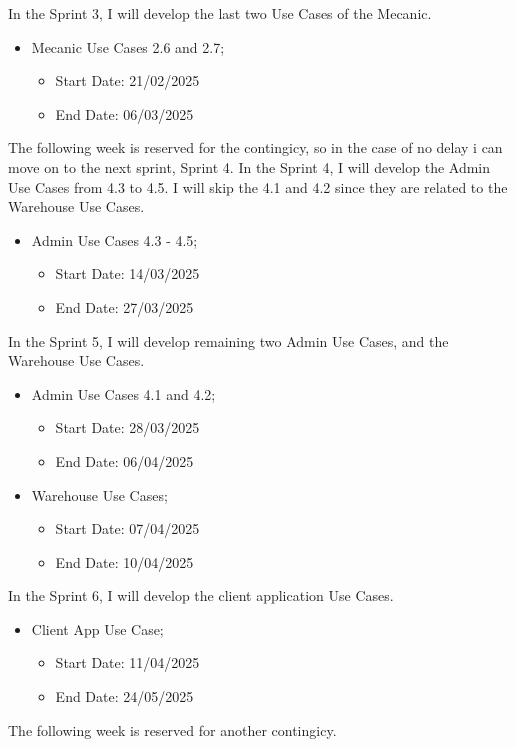In the Sprint 3, I will develop the last two Use Cases of the Mecanic.  

  \begin{itemize}
    \item Mecanic Use Cases 2.6 and 2.7;
    \begin{itemize}
      \item Start Date: 21/02/2025 
      \item End Date: 06/03/2025 
  \end{itemize}
\end{itemize}

The following week is reserved for the contingicy, so in the case of no delay i can move on to the next sprint, Sprint 4.
In the Sprint 4, I will develop the Admin Use Cases from 4.3 to 4.5. I will skip the 4.1 and 4.2 since they are related to the Warehouse Use Cases.

    \begin{itemize}
      \item Admin Use Cases 4.3 - 4.5;
    \begin{itemize}
      \item Start Date: 14/03/2025 
      \item End Date: 27/03/2025 
  \end{itemize}
\end{itemize}

In the Sprint 5, I will develop remaining two Admin Use Cases, and the Warehouse Use Cases.

\begin{itemize}
  \item Admin Use Cases 4.1 and 4.2;
  \begin{itemize}
    \item Start Date: 28/03/2025 
    \item End Date: 06/04/2025 
  \end{itemize}
  \item Warehouse Use Cases;
  \begin{itemize}
    \item Start Date: 07/04/2025 
    \item End Date: 10/04/2025 
  \end{itemize}
\end{itemize}

In the Sprint 6, I will develop the client application Use Cases.

\begin{itemize}
  \item Client App Use Case;
  \begin{itemize}
    \item Start Date: 11/04/2025  
    \item End Date: 24/05/2025 
  \end{itemize} 
\end{itemize}
The following week is reserved for another contingicy.

